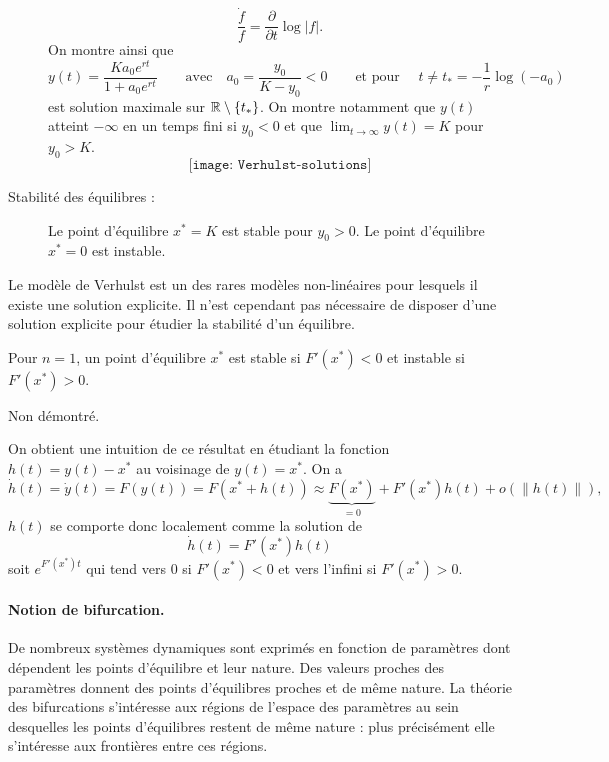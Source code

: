 \begin{description}
  $$
  \frac{\dot f}{f} = \frac{\partial}{\partial t} \log |f|.
  $$
  On montre ainsi que 
  $$
  y(t) = \frac{K a_ 0 e^{rt}}{1 +  a_0 e^{rt}}
  \qquad \text{avec} \quad a_0 = \frac{y_0}{K-y_0} < 0
  \qquad \text{et pour } \quad t \neq t_* = -\frac1r \log(-a_0)
  $$
  est solution maximale sur $\mathbb{R} \setminus \left\{t_*\right\}$.
  On montre notamment que $y(t)$ atteint $- \infty$ en un temps fini si $y_0 < 0$ et que $\lim_{t \rightarrow \infty} y(t) = K$ pour $y_0 > K$.
  $$
  \texttt{[image: Verhulst-solutions]}
  $$
  \item[Stabilité des équilibres :]
  Le point d'équilibre $x^* = K$ est stable pour $y_0 > 0$. Le point d'équilibre $x^* = 0$ est instable.
\end{description}

\remark
Le modèle de Verhulst est un des rares modèles non-linéaires pour lesquels il existe une solution explicite. Il n'est cependant pas nécessaire de disposer d'une solution explicite pour étudier la stabilité d'un équilibre.

\begin{theorem}[Stabilité ($n = 1$)]
  Pour $n=1$, un point d'équilibre $x^*$ est stable si $F'(x^*) < 0$ et instable si $F'(x^*) > 0$.
\end{theorem}

\proof Non démontré. \eproof

\remark
On obtient une intuition de ce résultat en étudiant la fonction $h(t) = y(t) - x^*$ au voisinage de $y(t) = x^*$. On a
$$
\dot h(t) = \dot y(t) = F(y(t)) = F(x^* + h(t)) \approx \underset{=0}{\underbrace{F(x^*)}} + F'(x^*) h(t) + o(\|h(t)\|),
$$
$h(t)$ se comporte donc localement comme la solution de 
$$
\dot h(t) = F'(x^*) h(t)
$$
soit $e ^{F'(x^*) t}$ qui tend vers 0 si $F'(x^*) < 0$ et vers l'infini si $F'(x^*) > 0$.

\paragraph*{Notion de bifurcation.}
De nombreux systèmes dynamiques sont exprimés en fonction de paramètres dont dépendent les points d'équilibre et leur nature. Des valeurs proches des paramètres donnent des points d'équilibres proches et de même nature. La théorie des bifurcations s'intéresse aux régions de l'espace des paramètres au sein desquelles les points d'équilibres restent de même nature : plus précisément elle s'intéresse aux frontières entre ces régions.

